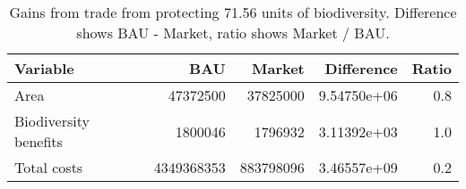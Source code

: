 \begin{table}

\caption{\label{tab:gains-from-trade}Gains from trade from protecting 71.56 units of biodiversity. Difference shows BAU - Market, ratio shows Market / BAU.}
\centering
\begin{tabular}[t]{l|r|r|r|r}
\hline
Variable & BAU & Market & Difference & Ratio\\
\hline
Area & 47372500 & 37825000 & 9.54750e+06 & 0.8\\
\hline
Biodiversity benefits & 1800046 & 1796932 & 3.11392e+03 & 1.0\\
\hline
Total costs & 4349368353 & 883798096 & 3.46557e+09 & 0.2\\
\hline
\end{tabular}
\end{table}